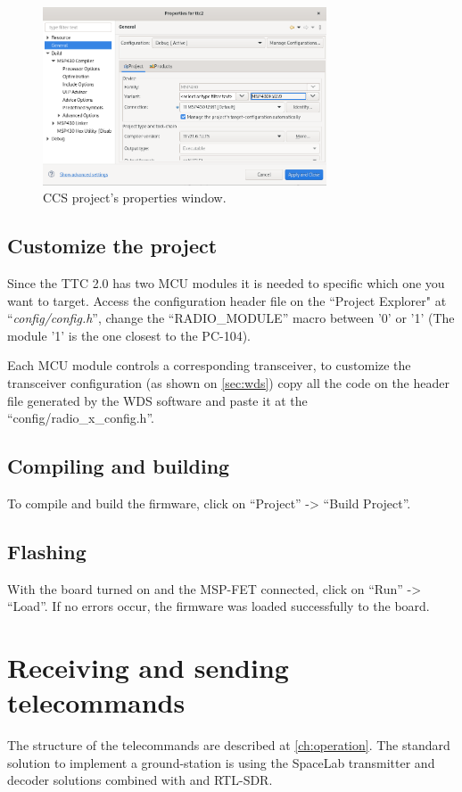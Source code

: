 \begin{figure}[!h]
	\begin{center}
		\includegraphics[width=0.75\textwidth]{figures/ccs_properties.png}
		\caption{CCS project's properties window.}
		\label{fig:project_properties}
	\end{center}
\end{figure}

\subsection{Customize the project}

Since the TTC 2.0 has two MCU modules it is needed to specific which one you want to target. Access the configuration header file on the ``Project Explorer" at ``\textit{config/config.h}'', change the ``RADIO\_MODULE'' macro between '0' or '1' (The module '1' is the one closest to the PC-104).

Each MCU module controls a corresponding transceiver, to customize the transceiver configuration (as shown on \autoref{sec:wds}) copy all the code on the header file generated by the WDS software and paste it at the ``config/radio\_x\_config.h''.

\subsection{Compiling and building}

To compile and build the firmware, click on ``Project'' -> ``Build Project''.

\subsection{Flashing}

With the board turned on and the MSP-FET connected, click on ``Run'' -> ``Load''. If no errors occur, the firmware was loaded successfully to the board.

\section{Receiving and sending telecommands}

The structure of the telecommands are described at \autoref{ch:operation}. The standard solution to implement a ground-station is using the SpaceLab transmitter and decoder solutions \cite{sl-transmitter} \cite{sl-decoder} combined with and RTL-SDR.
